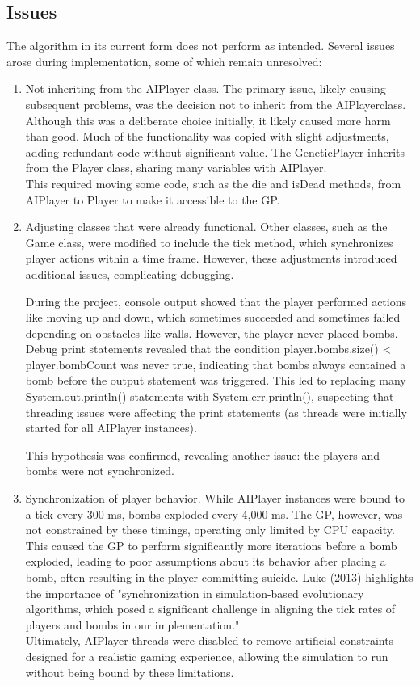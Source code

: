 \documentclass[sigconf]{acmart} %
\begin{document}
\subsection{Issues}
The algorithm in its current form does not perform as intended. Several issues arose during implementation, some of which remain unresolved: 
\begin{enumerate}
      \item Not inheriting from the AIPlayer class. 
      The primary issue, likely causing subsequent problems, was the decision not to inherit from the AIPlayerclass. Although this was a deliberate choice initially, it likely caused more harm than good. Much of the functionality was copied with slight adjustments, adding redundant code without significant value. The GeneticPlayer inherits from the Player class, sharing many variables with AIPlayer. \\ 
This required moving some code, such as the die and isDead methods, from AIPlayer to Player to make it accessible to the GP.
      \item Adjusting classes that were already functional. 
      Other classes, such as the Game class, were modified to include the tick method, which synchronizes player actions within a time frame. However, these adjustments introduced additional issues, complicating debugging. 
	  
	During the project, console output showed that the player performed actions like moving up and down, which sometimes succeeded and sometimes failed depending on obstacles like walls. However, the player never placed bombs. Debug print statements revealed that the condition player.bombs.size() < player.bombCount was never true, indicating that bombs always contained a bomb before the output statement was triggered. This led to replacing many System.out.println() statements with System.err.println(), suspecting that threading issues were affecting the print statements (as threads were initially started for all AIPlayer instances). 
 
 This hypothesis was confirmed, revealing another issue: the players and bombs were not synchronized.
      \item Synchronization of player behavior. 
      While AIPlayer instances were bound to a tick every 300 ms, bombs exploded every 4,000 ms. The GP, however, was not constrained by these timings, operating only limited by CPU capacity. This caused the GP to perform significantly more iterations before a bomb exploded, leading to poor assumptions about its behavior after placing a bomb, often resulting in the player committing suicide. Luke (2013) highlights the importance of \cite{Luke2013Metaheuristics} "synchronization in simulation-based evolutionary algorithms, which posed a significant challenge in aligning the tick rates of players and bombs in our implementation." \\ 
	  Ultimately, AIPlayer threads were disabled to remove artificial constraints designed for a realistic gaming experience, allowing the simulation to run without being bound by these limitations. 
   

\end{enumerate}
\end{document}
